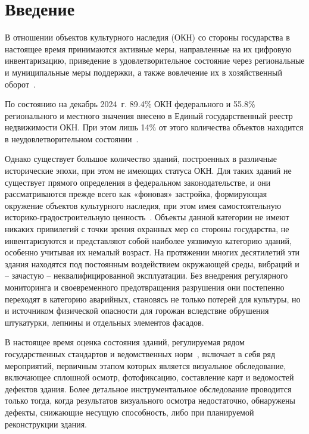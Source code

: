 \documentclass[14pt]{extarticle}
\begin{document}
\section*{Введение}
\label{sec:intro}

В отношении объектов культурного наследия (ОКН) со стороны государства в настоящее
время принимаются активные меры, направленные на их цифровую инвентаризацию,
приведение в удовлетворительное состояние через региональные и муниципальные меры
поддержки, а также вовлечение их в хозяйственный оборот~\cite{gosprog2025}.

По состоянию на декабрь 2024~г. 89.4\% ОКН федерального
и 55.8\% регионального и местного значения внесено в Единый государственный реестр
недвижимости ОКН. При этом лишь 14\% от этого количества
объектов находится в неудовлетворительном состоянии~\cite{gosprog2025}.

Однако существует большое количество зданий, построенных в различные исторические
эпохи, при этом не имеющих статуса ОКН. Для таких зданий
не существует прямого определения в федеральном законодательстве, и они
рассматриваются прежде всего как «фоновая» застройка, формирующая окружение
объектов культурного наследия, при этом имея самостоятельную историко-градостроительную
ценность~\cite{fz73}. Объекты данной категории не имеют никаких привилегий
с точки зрения охранных мер со стороны государства, не инвентаризуются и
представляют собой наиболее уязвимую категорию зданий, особенно учитывая их
немалый возраст. На протяжении многих десятилетий эти здания находятся под
постоянным воздействием окружающей среды, вибраций и -- зачастую --
неквалифицированной эксплуатации. Без внедрения регулярного мониторинга
и своевременного предотвращения разрушения они постепенно переходят в категорию
аварийных, становясь не только потерей для культуры, но и источником физической
опасности для горожан вследствие обрушения штукатурки, лепнины и отдельных
элементов фасадов.

В настоящее время оценка состояния зданий, регулируемая рядом государственных
стандартов и ведомственных норм~\cite{gost31937,gost55567,vsn5386,vsn5888,%
sp13102,srp2007}, включает в себя ряд мероприятий, первичным этапом которых
является визуальное обследование, включающее сплошной осмотр, фотофиксацию,
составление карт и ведомостей дефектов здания. Более детальное инструментальное
обследование проводится только тогда, когда результатов визуального осмотра
недостаточно, обнаружены дефекты, снижающие несущую способность, либо при
планируемой реконструкции здания.
\end{document}
